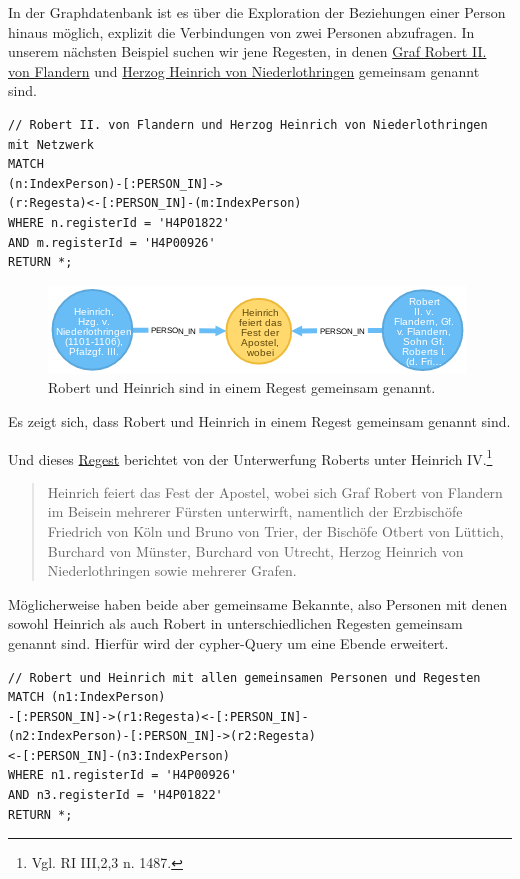 \documentclass[ngerman,]{scrreprt}
\begin{document}
In der Graphdatenbank ist es über die Exploration der Beziehungen einer Person hinaus möglich, explizit die Verbindungen von zwei Personen abzufragen. In unserem nächsten Beispiel suchen wir jene Regesten, in denen \href{https://de.wikipedia.org/wiki/Robert_II._(Flandern)}{Graf Robert II. von Flandern} und \href{https://de.wikipedia.org/wiki/Heinrich_I._(Limburg)}{Herzog Heinrich von Niederlothringen} gemeinsam genannt sind.

\begin{verbatim}
// Robert II. von Flandern und Herzog Heinrich von Niederlothringen mit Netzwerk
MATCH
(n:IndexPerson)-[:PERSON_IN]->
(r:Regesta)<-[:PERSON_IN]-(m:IndexPerson)
WHERE n.registerId = 'H4P01822'
AND m.registerId = 'H4P00926'
RETURN *;
\end{verbatim}

\begin{figure}
\centering
\includegraphics{Bilder/RI2Graph/RobertundHeinrich.png}
\caption{Robert und Heinrich sind in einem Regest gemeinsam genannt.}
\end{figure}

Es zeigt sich, dass Robert und Heinrich in einem Regest gemeinsam genannt sind.

Und dieses \href{http://www.regesta-imperii.de/id/cf75356b-bd0d-4a67-8aeb-3ae27d1dcefa}{Regest} berichtet von der Unterwerfung Roberts unter Heinrich IV.\footnote{Vgl. RI III,2,3 n. 1487.}

\begin{quote}
Heinrich feiert das Fest der Apostel, wobei sich Graf Robert von Flandern im Beisein mehrerer Fürsten unterwirft, namentlich der Erzbischöfe Friedrich von Köln und Bruno von Trier, der Bischöfe Otbert von Lüttich, Burchard von Münster, Burchard von Utrecht, Herzog Heinrich von Niederlothringen sowie mehrerer Grafen.
\end{quote}

Möglicherweise haben beide aber gemeinsame Bekannte, also Personen mit denen sowohl Heinrich als auch Robert in unterschiedlichen Regesten gemeinsam genannt sind. Hierfür wird der cypher-Query um eine Ebende erweitert.

\begin{verbatim}
// Robert und Heinrich mit allen gemeinsamen Personen und Regesten
MATCH (n1:IndexPerson)
-[:PERSON_IN]->(r1:Regesta)<-[:PERSON_IN]-
(n2:IndexPerson)-[:PERSON_IN]->(r2:Regesta)
<-[:PERSON_IN]-(n3:IndexPerson)
WHERE n1.registerId = 'H4P00926'
AND n3.registerId = 'H4P01822'
RETURN *;
\end{verbatim}
\end{document}
